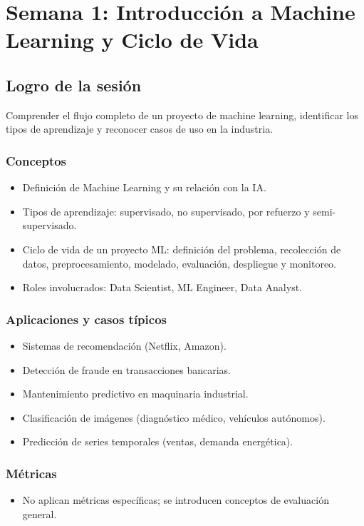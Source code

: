 \documentclass[12pt,a4paper,openany,oneside]{book}
\begin{document}
\chapter{Semana 1: Introducción a Machine Learning y Ciclo de Vida}

\section{Logro de la sesión}
Comprender el flujo completo de un proyecto de machine learning, identificar los tipos de aprendizaje y reconocer casos de uso en la industria.

\subsection{Conceptos}
\begin{itemize}
    \item Definición de Machine Learning y su relación con la IA.
    \item Tipos de aprendizaje: supervisado, no supervisado, por refuerzo y semi-supervisado.
    \item Ciclo de vida de un proyecto ML: definición del problema, recolección de datos, preprocesamiento, modelado, evaluación, despliegue y monitoreo.
    \item Roles involucrados: Data Scientist, ML Engineer, Data Analyst.
\end{itemize}

\subsection{Aplicaciones y casos típicos}
\begin{itemize}
    \item Sistemas de recomendación (Netflix, Amazon).
    \item Detección de fraude en transacciones bancarias.
    \item Mantenimiento predictivo en maquinaria industrial.
    \item Clasificación de imágenes (diagnóstico médico, vehículos autónomos).
    \item Predicción de series temporales (ventas, demanda energética).
\end{itemize}

\subsection{Métricas}
\begin{itemize}
    \item No aplican métricas específicas; se introducen conceptos de evaluación general.
\end{itemize}
\end{document}

